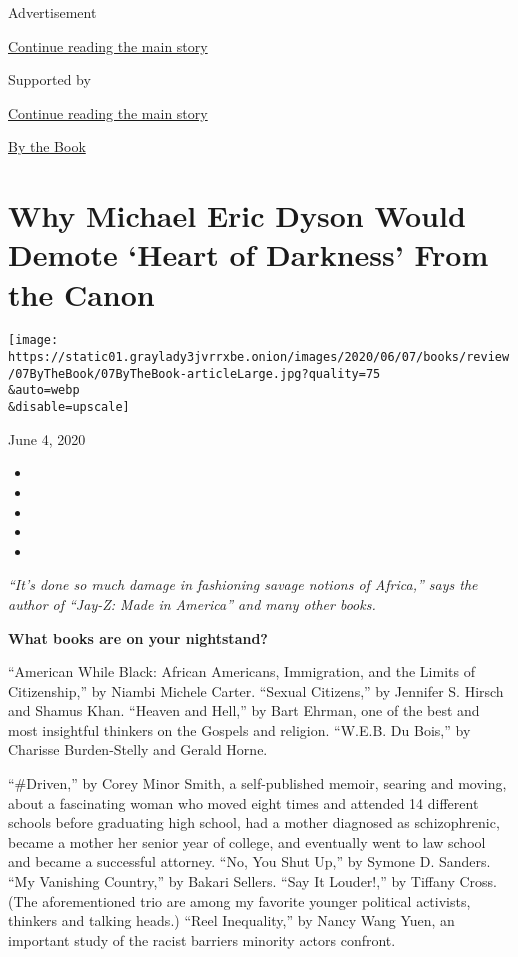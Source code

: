 Advertisement

\protect\hyperlink{after-top}{Continue reading the main story}

Supported by

\protect\hyperlink{after-sponsor}{Continue reading the main story}

\href{/column/by-the-book}{By the Book}

\hypertarget{why-michael-eric-dyson-would-demote-heart-of-darkness-from-the-canon}{%
\section{Why Michael Eric Dyson Would Demote `Heart of Darkness' From
the
Canon}\label{why-michael-eric-dyson-would-demote-heart-of-darkness-from-the-canon}}

\texttt{[image: https://static01.graylady3jvrrxbe.onion/images/2020/06/07/books/review/07ByTheBook/07ByTheBook-articleLarge.jpg?quality=75\\\&auto=webp\\\&disable=upscale]}

June 4, 2020

\begin{itemize}
\item
\item
\item
\item
\item
\end{itemize}

\emph{``It's done so much damage in fashioning savage notions of
Africa,'' says the author of ``Jay-Z: Made in America'' and many other
books.}

\textbf{What books are on your nightstand?}

``American While Black: African Americans, Immigration, and the Limits
of Citizenship,'' by Niambi Michele Carter. ``Sexual Citizens,'' by
Jennifer S. Hirsch and Shamus Khan. ``Heaven and Hell,'' by Bart Ehrman,
one of the best and most insightful thinkers on the Gospels and
religion. ``W.E.B. Du Bois,'' by Charisse Burden-Stelly and Gerald
Horne.

``\#Driven,'' by Corey Minor Smith, a self-published memoir, searing and
moving, about a fascinating woman who moved eight times and attended 14
different schools before graduating high school, had a mother diagnosed
as schizophrenic, became a mother her senior year of college, and
eventually went to law school and became a successful attorney. ``No,
You Shut Up,'' by Symone D. Sanders. ``My Vanishing Country,'' by Bakari
Sellers. ``Say It Louder!,'' by Tiffany Cross. (The aforementioned trio
are among my favorite younger political activists, thinkers and talking
heads.) ``Reel Inequality,'' by Nancy Wang Yuen, an important study of
the racist barriers minority actors confront.

